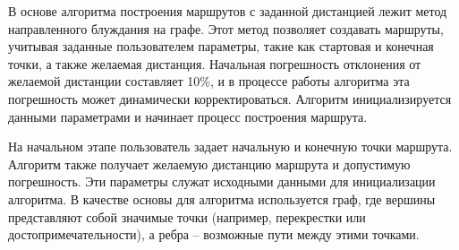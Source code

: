%
%



В основе алгоритма построения маршрутов с заданной дистанцией лежит метод направленного блуждания на графе. Этот метод позволяет создавать маршруты, учитывая заданные пользователем параметры, такие как стартовая и конечная точки, а также желаемая дистанция. Начальная погрешность отклонения от желаемой дистанции составляет 10\%, и в процессе работы алгоритма эта погрешность может динамически корректироваться. Алгоритм инициализируется данными параметрами и начинает процесс построения маршрута.

На начальном этапе пользователь задает начальную и конечную точки маршрута. Алгоритм также получает желаемую дистанцию маршрута и допустимую погрешность. Эти параметры служат исходными данными для инициализации алгоритма. В качестве основы для алгоритма используется граф, где вершины представляют собой значимые точки (например, перекрестки или достопримечательности), а ребра – возможные пути между этими точками.

